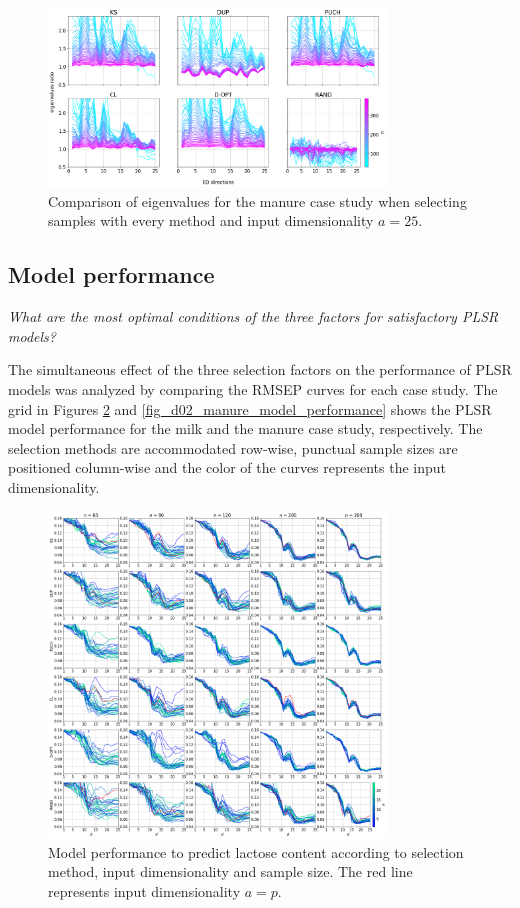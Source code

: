\documentclass[journal=ancham,manuscript=article]{achemso}
\begin{document}
\begin{figure}[b]
\includegraphics[width=0.8\textwidth]{manuscript/figures/d02_manure_specific_framework_eigenvalsratio.png}
\centering
\caption{Comparison of eigenvalues for the manure case study when selecting samples with every method and input dimensionality $a=25$.}
\label{fig_d02_manure_specific_framework_eigenvalsratio}
\end{figure}

\subsection*{Model performance}\label{results:modperformance}


\emph{What are the most optimal conditions of the three factors for satisfactory PLSR models?}

The simultaneous effect of the three selection factors on the performance of PLSR models was analyzed by comparing the RMSEP curves for each case study. The grid in Figures \ref{fig_d01_milk_model_performance} and \ref{fig_d02_manure_model_performance} shows the PLSR model performance for the milk and the manure case study, respectively. The selection methods are accommodated row-wise, punctual sample sizes are positioned column-wise and the color of the curves represents the input dimensionality. 


\begin{figure}[b]
\includegraphics[width=0.8\textwidth]{manuscript/figures/d01_milk_model_performance.png}
\centering
\caption{Model performance to predict lactose content according to selection method, input dimensionality and sample size. The red line represents input dimensionality $a=p$.}
\label{fig_d01_milk_model_performance}
\end{figure}
\end{document}
